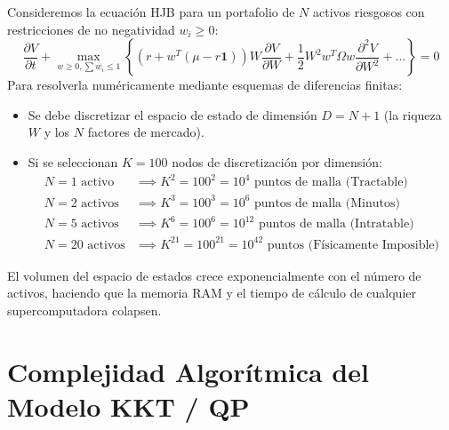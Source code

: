 \documentclass[11pt,a4paper]{report}
\numberwithin{equation}{chapter}
\begin{document}
\begin{demobox}
Consideremos la ecuación HJB para un portafolio de $N$ activos riesgosos con restricciones de no negatividad $w_i \ge 0$:
\begin{equation}
    \frac{\partial V}{\partial t} + \max_{w \ge 0, \sum w_i \le 1} \left\{ \left( r + w^T(\mu - r\mathbf{1}) \right) W \frac{\partial V}{\partial W} + \frac{1}{2} W^2 w^T \Omega w \frac{\partial^2 V}{\partial W^2} + \dots \right\} = 0
\end{equation}
Para resolverla numéricamente mediante esquemas de diferencias finitas:
\begin{itemize}
    \item Se debe discretizar el espacio de estado de dimensión $D = N + 1$ (la riqueza $W$ y los $N$ factores de mercado).
    \item Si se seleccionan $K = 100$ nodos de discretización por dimensión:
    \begin{align}
        N = 1 \text{ activo}  &\implies K^2 = 100^2 = 10^4 \text{ puntos de malla (Tractable)} \nonumber \\
        N = 2 \text{ activos} &\implies K^3 = 100^3 = 10^6 \text{ puntos de malla (Minutos)} \nonumber \\
        N = 5 \text{ activos} &\implies K^6 = 100^6 = 10^{12} \text{ puntos de malla (Intratable)} \nonumber \\
        N = 20 \text{ activos} &\implies K^{21} = 100^{21} = 10^{42} \text{ puntos (Físicamente Imposible)} \nonumber
    \end{align}
\end{itemize}
El volumen del espacio de estados crece exponencialmente con el número de activos, haciendo que la memoria RAM y el tiempo de cálculo de cualquier supercomputadora colapsen.
\end{demobox}

\section{Complejidad Algorítmica del Modelo KKT / QP}
\end{document}
